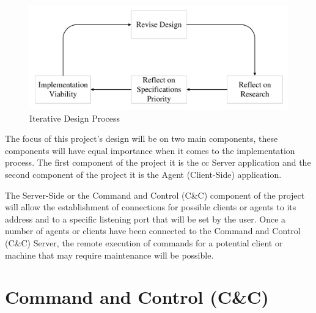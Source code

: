 \begin{figure}[h]
    \centering
    \includegraphics[width=1.0\textwidth]{images/design.pdf}
    \captionsetup{justification=centering}
    \caption[Iterative Design Process]{Iterative Design Process}
    \label{fig:iterative-design}
\end{figure}

\newpage

The focus of this project's design will be on two main components, these components
will have equal importance when it comes to the implementation process.
The first component of the project it is the \acrfull{cc} Server application and the second component
of the project it is the Agent (Client-Side) application.

The Server-Side or the Command and Control (C\&C) component of the project
will allow the establishment of connections for possible clients or agents to its address and to
a specific listening port that will be set by the user. Once a number of agents or clients have been
connected to the Command and Control (C\&C) Server, the remote execution of commands for a potential
client or machine that may require maintenance will be possible.

\section{Command and Control (C\&C)}

